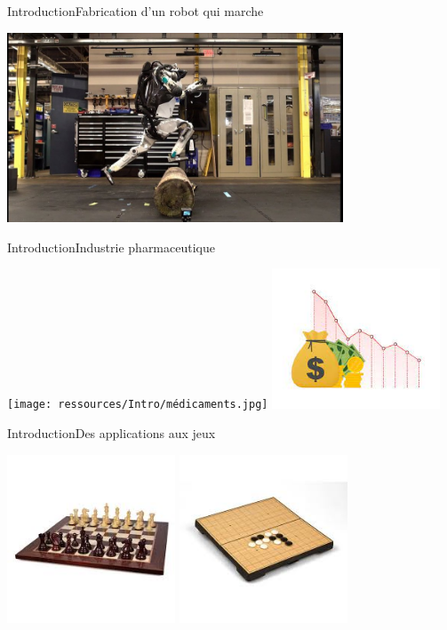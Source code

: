 \begin{frame}{Introduction}{Fabrication d'un robot qui marche}
	\begin{center}
		\includegraphics[width=10cm]{ressources/Intro/Robot saut.jpg}
	\end{center}
\end{frame}
\begin{frame}{Introduction}{Industrie pharmaceutique}
	\begin{center}
		\texttt{[image: ressources/Intro/médicaments.jpg]}
		\includegraphics[width=5cm]{ressources/Intro/prix.jpg}
	\end{center}
\end{frame}
\begin{frame}{Introduction}{Des applications aux jeux}
	\begin{center}
		\includegraphics[width=5cm]{ressources/Intro/Echecs.jpg}
		\includegraphics[width=5cm]{ressources/Intro/GO.jpg}
	\end{center}
\end{frame}
